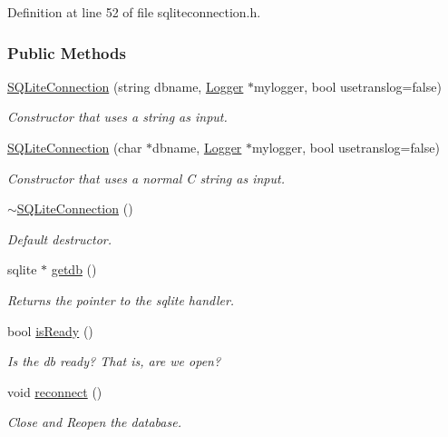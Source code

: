 Definition at line 52 of file sqliteconnection.h.\subsubsection*{Public Methods}
\begin{CompactItemize}
\item 
\hyperlink{classSQLiteConnection_SQLiteConnectiona0}{SQLite\-Connection} (string dbname, \hyperlink{classLogger}{Logger} $\ast$mylogger, bool usetranslog=false)
\begin{CompactList}\small\item\em Constructor that uses a string as input.\item\end{CompactList}\item 
\hyperlink{classSQLiteConnection_SQLiteConnectiona1}{SQLite\-Connection} (char $\ast$dbname, \hyperlink{classLogger}{Logger} $\ast$mylogger, bool usetranslog=false)
\begin{CompactList}\small\item\em Constructor that uses a normal C string as input.\item\end{CompactList}\item 
\hyperlink{classSQLiteConnection_SQLiteConnectiona2}{$\sim$SQLite\-Connection} ()
\begin{CompactList}\small\item\em Default destructor.\item\end{CompactList}\item 
sqlite $\ast$ \hyperlink{classSQLiteConnection_SQLiteConnectiona3}{getdb} ()
\begin{CompactList}\small\item\em Returns the pointer to the sqlite handler.\item\end{CompactList}\item 
bool \hyperlink{classSQLiteConnection_SQLiteConnectiona4}{is\-Ready} ()
\begin{CompactList}\small\item\em Is the db ready? That is, are we open?\item\end{CompactList}\item 
void \hyperlink{classSQLiteConnection_SQLiteConnectiona5}{reconnect} ()
\begin{CompactList}\small\item\em Close and Reopen the database.\item\end{CompactList}\item 

\end{CompactItemize}
